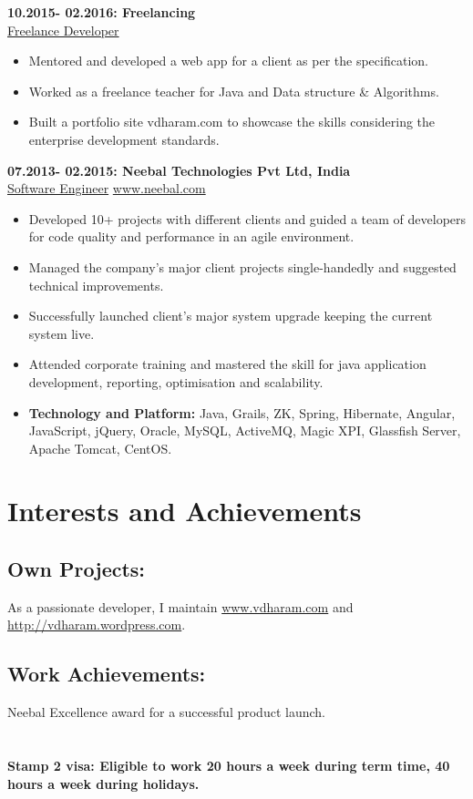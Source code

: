 \documentclass{article}
\begin{document}
\textbf{10.2015- 02.2016: \hfill Freelancing\\}
\underline{Freelance Developer}
\begin{itemize}
	\itemsep0em
	\item Mentored and developed a web app for a client as per the specification.
	\item Worked as a freelance teacher for Java and Data structure \& Algorithms.
	\item Built a portfolio site vdharam.com to showcase the skills considering the enterprise development standards.
\end{itemize}
\textbf{07.2013- 02.2015: \hfill Neebal Technologies Pvt Ltd, India \\}
\underline{Software Engineer} \hfill \href{www.neebal.com}{www.neebal.com}
\begin{itemize}
	\itemsep0em
	\item Developed 10+ projects with different clients and guided a team of developers for code quality and performance in an agile environment.
	\item Managed the company’s major client projects single-handedly and suggested technical improvements.
	\item Successfully launched client’s major system upgrade keeping the current system live.
	\item Attended corporate training and mastered the skill for java application development, reporting, optimisation and scalability.
	\item \textbf{Technology and Platform:} Java, Grails, ZK, Spring, Hibernate, Angular, JavaScript, jQuery, Oracle, MySQL, ActiveMQ, Magic XPI, Glassfish Server, Apache Tomcat, CentOS.
\end{itemize}

\section{Interests and Achievements}
\subsection{Own Projects:}
As a passionate developer, I maintain \href{www.vdharam.com}{www.vdharam.com} and \href{http://vdharam.wordpress.com}{http://vdharam.wordpress.com}.
\subsection{Work Achievements:}
Neebal Excellence award for a successful product launch.

\section{}
\bfseries
Stamp 2 visa: Eligible to work 20 hours a week during term time, 40 hours a week during holidays.
\end{document}

